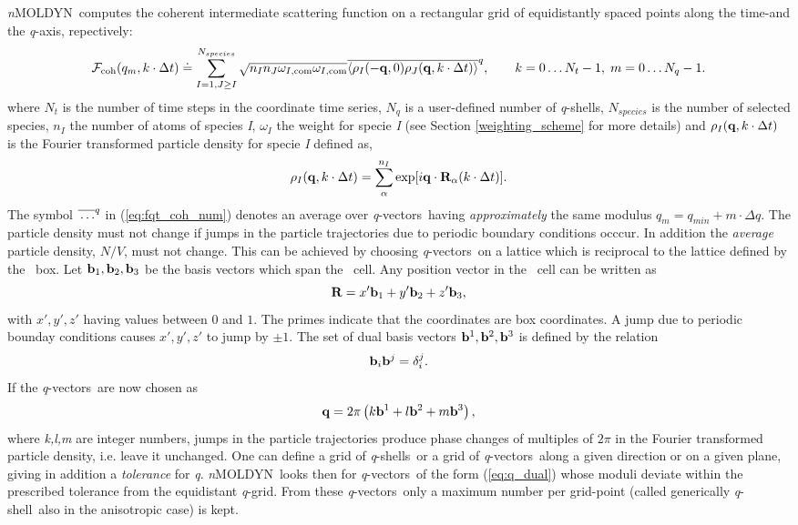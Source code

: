 \documentclass[a4paper,11pt]{report}
\newcommand{\qval}{\textit{q}}
\newcommand{\qvects}{\textit{q}-vectors}
\newcommand{\qshell}{\textit{q}-shell}
\newcommand{\qshells}{\textit{q}-shells}
\newcommand{\NMOLDYN}{\textit{n}MOLDYN}
\begin{document}
\NMOLDYN\ computes the coherent intermediate scattering function on a rectangular grid of equidistantly spaced points along 
the time-and the \qval-axis, repectively:
\begin{equation} 
\label{eq:fqt_coh_num}
{\cal F}_{\mathrm{coh}}(q_m,k\cdot\Delta t) \doteq \sum^{N_{species}}_{I=1,J\ge I} \sqrt{n_I n_J \omega_{I,\mathrm{com}}\omega_{I,\mathrm{com}}}
\overline{\langle \rho_I(-{\bf q},0)\rho_J({\bf q},k\cdot\Delta t) \rangle}^{q},
\qquad k = 0\ldots N_t - 1,\; m = 0\ldots N_q - 1. 
\end{equation} 
where $N_t$ is the number of time steps in the coordinate time series, $N_q$ is a user-defined number of \qshells, 
$N_{species}$ is the number of selected species, $n_I$ the number of atoms of species \textit{I}, $\omega_I$ the weight for specie 
\textit{I} (see Section \ref{weighting_scheme} for more details) and $\rho_I({\bf q},k\cdot\Delta t)$ is the Fourier transformed particle 
density for specie \textit{I} defined as,
\begin{equation}
\label{eq:dcsf_rho}
\rho_I({\bf q},k\cdot\Delta t) = \sum_\alpha^{n_I} \exp[i{\bf q}\cdot{\bf R}_\alpha(k\cdot\Delta t)].
\end{equation}
The symbol $\overline{\rule{0pt}{5pt}\ldots}^{q}$ in (\ref{eq:fqt_coh_num}) denotes an average over \qvects\ having 
{\em approximately} the same modulus $q_m = q_{min} + m\cdot\Delta q$. The particle density must not change if jumps in 
the particle trajectories due to periodic boundary conditions occcur. In addition the {\em average} particle density, 
$N/V$, must not change. This can be achieved by choosing \qvects\ on a lattice which is reciprocal to the lattice defined 
by the \MD\ box. Let ${\bf b}_1,{\bf b}_2,{\bf b}_3$ be the basis vectors which span the \MD\ cell. Any position vector in the 
\MD\ cell can be written as
\begin{equation}
{\bf R} = x'{\bf b}_1 + y'{\bf b}_2 + z'{\bf b}_3,
\end{equation}
with $x',y',z'$ having values between $0$ and $1$.  The primes indicate that the coordinates are box coordinates. A jump due 
to periodic bounday conditions causes $x',y',z'$ to jump by $\pm 1$.  The set of dual basis vectors ${\bf b}^1,{\bf b}^2,{\bf b}^3$ 
is defined by the relation
\begin{equation}
{\bf b}_i{\bf b}^j = \delta_i^j.
\end{equation}
If the \qvects\ are now chosen as
\begin{equation}
\label{eq:q_dual}
{\bf q} = 2\pi\left(k{\bf b}^1 + l{\bf b}^2 + m{\bf b}^3\right),
\end{equation}
where \textit{k,l,m} are integer numbers, jumps in the particle trajectories produce phase changes of multiples of $2\pi$ in the 
Fourier transformed particle density, i.e. leave it unchanged. One can define a grid of \qshells\ or a grid of \qvects\ 
along a given direction or on a given plane, giving in addition a {\em tolerance} for \qval. \NMOLDYN\ looks then for 
\qvects\ of the form (\ref{eq:q_dual}) whose moduli deviate within the prescribed tolerance from the equidistant \qval-grid. 
From these \qvects\ only a maximum number per grid-point (called generically \qshell\ also in the anisotropic case) is 
kept.
\end{document}
